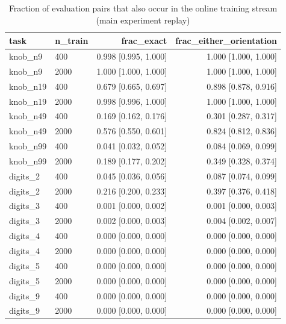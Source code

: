 \begin{table}[t]
\centering
\small
\begin{tabular}{llrr}
\toprule
task & n\_train & frac\_exact & frac\_either\_orientation \\
\midrule
knob\_n9 & 400 & 0.998 [0.995, 1.000] & 1.000 [1.000, 1.000] \\
knob\_n9 & 2000 & 1.000 [1.000, 1.000] & 1.000 [1.000, 1.000] \\
knob\_n19 & 400 & 0.679 [0.665, 0.697] & 0.898 [0.878, 0.916] \\
knob\_n19 & 2000 & 0.998 [0.996, 1.000] & 1.000 [1.000, 1.000] \\
knob\_n49 & 400 & 0.169 [0.162, 0.176] & 0.301 [0.287, 0.317] \\
knob\_n49 & 2000 & 0.576 [0.550, 0.601] & 0.824 [0.812, 0.836] \\
knob\_n99 & 400 & 0.041 [0.032, 0.052] & 0.084 [0.069, 0.099] \\
knob\_n99 & 2000 & 0.189 [0.177, 0.202] & 0.349 [0.328, 0.374] \\
digits\_2 & 400 & 0.045 [0.036, 0.056] & 0.087 [0.074, 0.099] \\
digits\_2 & 2000 & 0.216 [0.200, 0.233] & 0.397 [0.376, 0.418] \\
digits\_3 & 400 & 0.001 [0.000, 0.002] & 0.001 [0.000, 0.003] \\
digits\_3 & 2000 & 0.002 [0.000, 0.003] & 0.004 [0.002, 0.007] \\
digits\_4 & 400 & 0.000 [0.000, 0.000] & 0.000 [0.000, 0.000] \\
digits\_4 & 2000 & 0.000 [0.000, 0.000] & 0.000 [0.000, 0.000] \\
digits\_5 & 400 & 0.000 [0.000, 0.000] & 0.000 [0.000, 0.000] \\
digits\_5 & 2000 & 0.000 [0.000, 0.000] & 0.000 [0.000, 0.000] \\
digits\_9 & 400 & 0.000 [0.000, 0.000] & 0.000 [0.000, 0.000] \\
digits\_9 & 2000 & 0.000 [0.000, 0.000] & 0.000 [0.000, 0.000] \\
\bottomrule
\end{tabular}
\caption{Fraction of evaluation pairs that also occur in the online training stream (main experiment replay)}
\label{tab:eval_overlap_comparison}
\end{table}